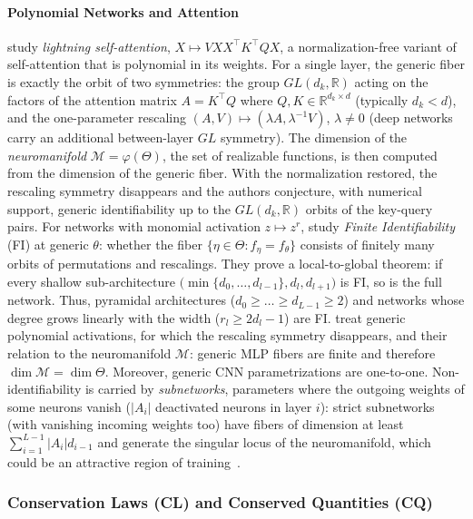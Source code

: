 \documentclass[mathematics,review,submit,moreauthors]{Definitions/mdpi}
\begin{document}
\paragraph{Polynomial Networks and Attention}
\citet{henry2025} study \emph{lightning self-attention}, $X\mapsto VXX^{\top}K^{\top}QX$, a normalization-free variant of self-attention that is polynomial in its weights.
For a single layer, the generic fiber is exactly the orbit of two symmetries: the group $GL(d_k,\mathbb{R})$ acting on the factors of the attention matrix $A=K^{\top}Q$ where $Q, K\in \mathbb R^{d_k\times d}$ (typically $d_k<d$), and the one-parameter rescaling $(A,V)\mapsto(\lambda A,\lambda^{-1}V)$, $\lambda\neq0$ (deep networks carry an additional between-layer $GL$ symmetry).
The dimension of the \emph{neuromanifold} $\mathcal{M}=\varphi(\Theta)$, the set of realizable functions, is then computed from the dimension of the generic fiber.
With the normalization restored, the rescaling symmetry disappears and the authors conjecture, with numerical support, generic identifiability up to the $GL(d_k,\mathbb{R})$ orbits of the key-query pairs.
For networks with monomial activation $z\mapsto z^{r}$, \citet{usevich2025} study \emph{Finite Identifiability} (FI) at generic $\theta$: whether the fiber $\{\eta\in\Theta : f_\eta=f_\theta\}$ consists of finitely many orbits of permutations and rescalings.
They prove a local-to-global theorem: if every shallow sub-architecture $\big(\min\{d_0,\dots,d_{l-1}\},d_l,d_{l+1}\big)$ is FI, so is the full network.
Thus, pyramidal architectures ($d_0\ge\dots\ge d_{L-1}\ge2$) and networks whose degree grows linearly with the width ($r_l\ge 2d_l-1$) are FI.
\citet{shahverdi2026} treat generic polynomial activations, for which the rescaling symmetry disappears, and their relation to the neuromanifold $\mathcal{M}$: generic MLP fibers are finite and therefore $\dim\mathcal{M}=\dim\Theta$.
Moreover, generic CNN parametrizations are one-to-one.
Non-identifiability is carried by \emph{subnetworks}, parameters where the outgoing weights of some neurons vanish ($|A_i|$ deactivated neurons in layer $i$): strict subnetworks (with vanishing incoming weights too) have fibers of dimension at least $\sum_{i=1}^{L-1}|A_i|d_{i-1}$ and generate the singular locus of the neuromanifold, which could be an attractive region of training~\citep{marchetti2025a}.

\subsubsection{Conservation Laws (CL) and Conserved Quantities (CQ)}\label{sec:conservation-laws}
\end{document}

